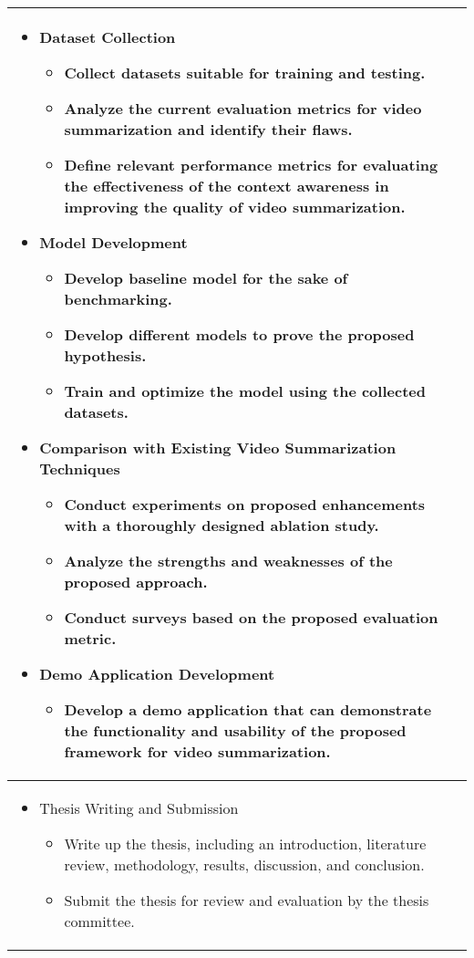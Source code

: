 \begin{longtable}{|l|c|}
\multicolumn{2}{|m{\linewidth}|}{\begin{itemize}
  \item Dataset Collection \begin{itemize}
    \item Collect datasets suitable for training and testing.
    \item Analyze the current evaluation metrics for video summarization and identify their flaws.
    \item Define relevant performance metrics for evaluating the effectiveness of the context awareness in improving the quality of video summarization.
  \end{itemize}
  \item Model Development\begin{itemize}
    \item Develop baseline model for the sake of benchmarking.
    \item Develop different models to prove the proposed hypothesis.
    \item Train and optimize the model using the collected datasets.
  \end{itemize}
  \item Comparison with Existing Video Summarization Techniques\begin{itemize}
    \item Conduct experiments on proposed enhancements with a thoroughly designed ablation study.
    \item Analyze the strengths and weaknesses of the proposed approach.
    \item Conduct surveys based on the proposed evaluation metric.
  \end{itemize}
  \item Demo Application Development\begin{itemize}
    \item Develop a demo application that can demonstrate the functionality and usability of the proposed framework for video summarization.
  \end{itemize}
\end{itemize}}\\
\hline

\multicolumn{2}{|m{\linewidth}|}{\begin{itemize}
  \item Thesis Writing and Submission\begin{itemize}
    \item Write up the thesis, including an introduction, literature review, methodology, results, discussion, and conclusion.
    \item Submit the thesis for review and evaluation by the thesis committee.
  \end{itemize}
\end{itemize}}\\


\end{longtable}
